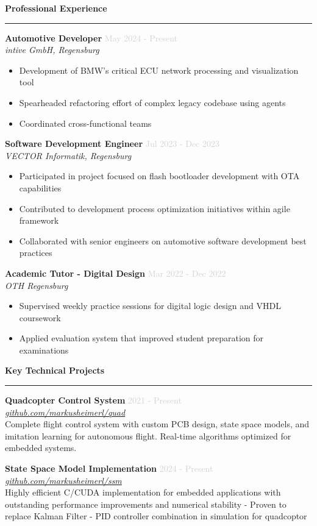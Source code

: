 \documentclass[a4paper,10pt]{article}
\newcommand{\cvsection}[1]{
    \vspace{12pt}
    {\large\bfseries\color{darkgray} #1}
    \vspace{4pt}
    \hrule
    \vspace{8pt}
}
\newcommand{\cventry}[4]{
    \vspace{3pt}
    \textbf{\color{darkgray}#1} \hfill \textcolor{lightgray}{\small #2} \\
    \textcolor{primaryblue}{\textit{\small #3}} \\
    \vspace{3pt}
    {\small #4}
    \vspace{8pt}
}
\begin{document}
\begin{paracol}{2}
\cvsection{Professional Experience}

\cventry{Automotive Developer}{May 2024 - Present}{intive GmbH, Regensburg}{
    \begin{itemize}[leftmargin=10pt, itemsep=2pt, parsep=0pt, topsep=3pt]
        \item Development of BMW's critical ECU network processing and visualization tool
        \item Spearheaded refactoring effort of complex legacy codebase using agents
        \item Coordinated cross-functional teams
    \end{itemize}
}

\cventry{Software Development Engineer}{Jul 2023 - Dec 2023}{VECTOR Informatik, Regensburg}{
    \begin{itemize}[leftmargin=10pt, itemsep=2pt, parsep=0pt, topsep=3pt]
        \item Participated in project focused on flash bootloader development with OTA capabilities
        \item Contributed to development process optimization initiatives within agile framework
        \item Collaborated with senior engineers on automotive software development best practices
    \end{itemize}
}

\cventry{Academic Tutor - Digital Design}{Mar 2022 - Dec 2022}{OTH Regensburg}{
    \begin{itemize}[leftmargin=10pt, itemsep=2pt, parsep=0pt, topsep=3pt]
        \item Supervised weekly practice sessions for digital logic design and VHDL coursework
        \item Applied evaluation system that improved student preparation for examinations
    \end{itemize}
}

\cvsection{Key Technical Projects}

\cventry{Quadcopter Control System}{2021 - Present}{\href{https://github.com/markusheimerl/quad}{github.com/markusheimerl/quad}}{
    Complete flight control system with custom PCB design, state space models, and imitation learning for autonomous flight. Real-time algorithms optimized for embedded systems.
}

\cventry{State Space Model Implementation}{2024 - Present}{\href{https://github.com/markusheimerl/ssm}{github.com/markusheimerl/ssm}}{
    Highly efficient C/CUDA implementation for embedded applications with outstanding performance improvements and numerical stability - Proven to replace Kalman Filter - PID controller combination in simulation for quadcoptor
}


\end{paracol}
\end{document}
